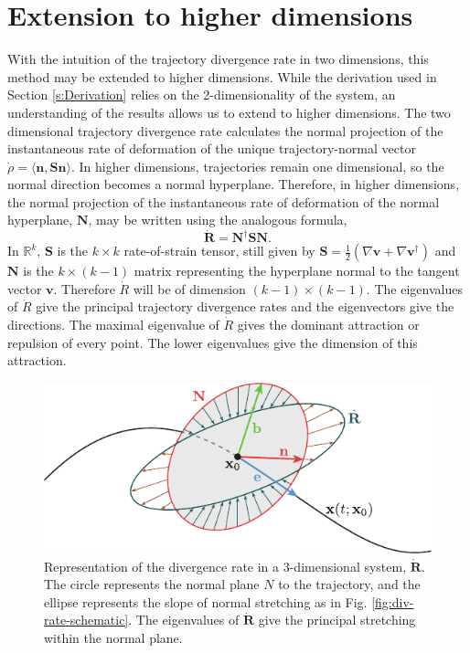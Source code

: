 \documentclass[twocolumn]{svjour3}
\newcommand{\edit}[3]{{\color{red} #2}}
\begin{document}
\section{Extension to higher dimensions}\label{s:HigherDimension}
With the intuition of the trajectory divergence rate in two dimensions, this method may be extended to higher dimensions. While the derivation used in Section \ref{s:Derivation} relies on the 2-dimensionality of the system, an understanding of the results \edit{}{allows us to extend to higher dimensions}{25}. The two dimensional trajectory divergence rate calculates the normal projection of the instantaneous rate of deformation of the unique trajectory-normal vector $\dot{\rho} = \langle \mathbf{n}, \mathbf{S}\mathbf{n}\rangle$. In higher dimensions, trajectories remain one dimensional, so the normal direction becomes a normal hyperplane. Therefore, in higher dimensions, the normal projection of the instantaneous rate of deformation of the normal hyperplane, $\mathbf{N}$, may be written using the analogous formula,
\begin{equation}\label{eq:higherdim-reprate}
\dot{\mathbf{R}} = \mathbf{N}^\dagger \mathbf{S}\mathbf{N}.
\end{equation}
In $\mathbb{R}^k$, $\mathbf{S}$ is the $k\times k$ rate-of-strain tensor, still given by $\mathbf{S}=\tfrac{1}{2}\left(\nabla \mathbf{v}+\nabla \mathbf{v}^\dagger\right)$ and $\mathbf{N}$ is the $k \times (k-1)$ matrix representing the hyperplane normal to the tangent vector $\mathbf{v}$. Therefore $\dot{R}$ will be of dimension $(k-1) \times (k-1)$. The eigenvalues of $\dot{R}$ give the principal trajectory divergence rates and the eigenvectors give the directions. The maximal eigenvalue of $\dot{R}$ gives the dominant attraction or repulsion of every point. The lower eigenvalues give the dimension of this attraction.

\begin{figure}
\centering
\includegraphics[width=5in]{Fig18}
\caption{Representation of the divergence rate in a 3-dimensional system, $\dot{\textbf{R}}$. The circle represents the normal plane $N$ to the trajectory, and the ellipse represents the slope of normal stretching as in Fig. \ref{fig:div-rate-schematic}. The eigenvalues of $\dot{\mathbf{R}}$ give the principal stretching within the normal plane.}
\label{fig:3dDivRateSchematic}
\end{figure}
\end{document}
